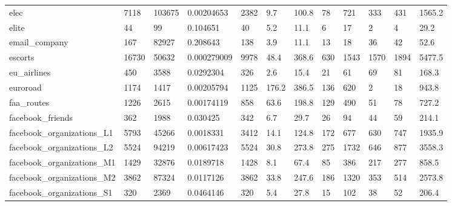 \begin{longtable}{llllllllllll}
 elec                                               & 7118       & 103675    & 0.00204653  & 2382  & 9.7    & 100.8  & 78    & 721    & 333    & 431    & 1565.2  \\
 elite                                              & 44         & 99        & 0.104651    & 40    & 5.2    & 11.1   & 6     & 17     & 2      & 4      & 29.2    \\
 email\_company                                      & 167        & 82927     & 0.208643    & 138   & 3.9    & 11.1   & 13    & 18     & 36     & 42     & 52.6    \\
 escorts                                            & 16730      & 50632     & 0.000279009 & 9978  & 48.4   & 368.6  & 630   & 1543   & 1570   & 1894   & 5477.5  \\
 eu\_airlines                                        & 450        & 3588      & 0.0292304   & 326   & 2.6    & 15.4   & 21    & 61     & 69     & 81     & 168.3   \\
 euroroad                                           & 1174       & 1417      & 0.00205794  & 1125  & 176.2  & 386.5  & 136   & 620    & 2      & 18     & 943.8   \\
 faa\_routes                                         & 1226       & 2615      & 0.00174119  & 858   & 63.6   & 198.8  & 129   & 490    & 51     & 78     & 727.2   \\
 facebook\_friends                                   & 362        & 1988      & 0.030425    & 342   & 6.7    & 29.7   & 26    & 94     & 44     & 59     & 214.1   \\
 facebook\_organizations\_L1                          & 5793       & 45266     & 0.0018331   & 3412  & 14.1   & 124.8  & 172   & 677    & 630    & 747    & 1935.9  \\
 facebook\_organizations\_L2                          & 5524       & 94219     & 0.00617423  & 5524  & 30.8   & 273.8  & 275   & 1732   & 646    & 877    & 3558.3  \\
 facebook\_organizations\_M1                          & 1429       & 32876     & 0.0189718   & 1428  & 8.1    & 67.4   & 85    & 386    & 217    & 277    & 858.5   \\
 facebook\_organizations\_M2                          & 3862       & 87324     & 0.0117126   & 3862  & 33.8   & 247.6  & 186   & 1320   & 353    & 514    & 2573.8  \\
 facebook\_organizations\_S1                          & 320        & 2369      & 0.0464146   & 320   & 5.4    & 27.8   & 15    & 102    & 38     & 52     & 206.4   \\

\end{longtable}

